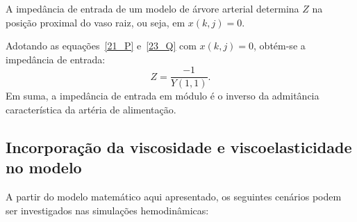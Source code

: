 \documentclass[a4paper,12pt]{monografia}
\theoremstyle{plain}
\theoremstyle{definition}
\theoremstyle{remark}
\begin{document}
A impedância de entrada de um modelo de árvore arterial determina $Z$ na posição proximal do vaso raiz, ou seja, em $x (k,j) = 0$. 

Adotando as equações~\eqref{21_P} e~\eqref{23_Q} com $x (k,j) = 0$, obtém-se a impedância de entrada:
\begin{equation}
	Z = \frac{-1}{Y(1,1)}.
\end{equation}
Em suma, a impedância de entrada  em módulo é o inverso da admitância característica da artéria de alimentação.

\subsection{Incorporação da viscosidade e viscoelasticidade no modelo}
\label{sec:cenario}
A partir do modelo matemático aqui apresentado, os seguintes cenários podem ser investigados nas simulações hemodinâmicas:
\end{document}
